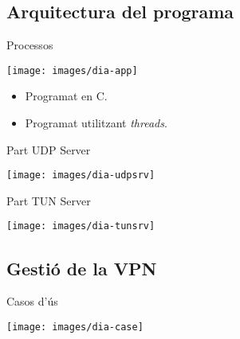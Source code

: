\subsection{Arquitectura del programa}
    \begin{frame}{Processos}
        \begin{center}
        \texttt{[image: images/dia-app]}
        \end{center}
		\begin{itemize}
\item Programat en C.
\item Programat utilitzant \emph{threads}.
		\end{itemize}
    \end{frame}
    \begin{frame}{Part UDP Server}
        \begin{center}
        \texttt{[image: images/dia-udpsrv]}
        \end{center}
    \end{frame}
    \begin{frame}{Part TUN Server}
        \begin{center}
        \texttt{[image: images/dia-tunsrv]}
        \end{center}
    \end{frame}
\subsection{Gestió de la VPN}
    \begin{frame}{Casos d'ús}
        \begin{center}
        \texttt{[image: images/dia-case]}
        \end{center}
    \end{frame}
